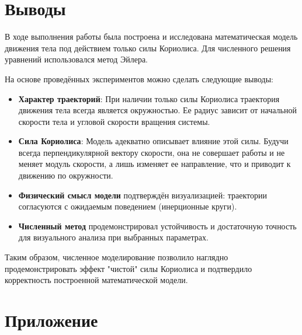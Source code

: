 \documentclass[a4paper,12pt]{article}
\begin{document}
\newpage

\section{Выводы}

В ходе выполнения работы была построена и исследована математическая модель движения тела под действием только силы Кориолиса. Для численного решения уравнений использовался метод Эйлера.

На основе проведённых экспериментов можно сделать следующие выводы:
\begin{itemize}
\item \textbf{Характер траекторий}: При наличии только силы Кориолиса траектория движения тела всегда является окружностью. Ее радиус зависит от начальной скорости тела и угловой скорости вращения системы.
\item \textbf{Сила Кориолиса}: Модель адекватно описывает влияние этой силы. Будучи всегда перпендикулярной вектору скорости, она не совершает работы и не меняет модуль скорости, а лишь изменяет ее направление, что и приводит к движению по окружности.
\item \textbf{Физический смысл модели} подтверждён визуализацией: траектории согласуются с ожидаемым поведением (инерционные круги).
\item \textbf{Численный метод} продемонстрировал устойчивость и достаточную точность для визуального анализа при выбранных параметрах.
\end{itemize}

Таким образом, численное моделирование позволило наглядно продемонстрировать эффект "чистой" силы Кориолиса и подтвердило корректность построенной математической модели.

\section{Приложение}
\end{document}
